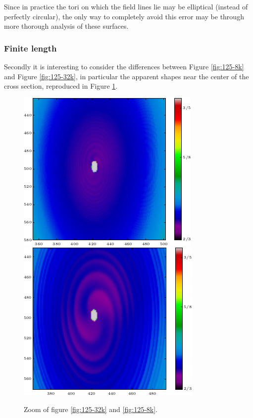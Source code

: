 \documentclass[a4paper]{article}
\begin{document}
Since in practice the tori on which the field lines lie may be elliptical (instead of perfectly circular), the only way to completely avoid this error may be through more thorough analysis of these surfaces.\\

\subsubsection{Finite length}
Secondly it is interesting to consider the differences between Figure \ref{fig:125-8k} and Figure \ref{fig:125-32k}, in particular the apparent shapes near the center of the cross section, reproduced in Figure \ref{fig:artefacts}.
\begin{figure}[!hb]
	\centering
{}
  \includegraphics[width=\linewidth]{Figures/artefact32k.png}
\endminipage ~
  \includegraphics[width=\linewidth]{Figures/artefact8k.png}
\endminipage\hfill
	\caption{Zoom of figure \ref{fig:125-32k} and \ref{fig:125-8k}.}\label{fig:artefacts}
\end{figure}
\end{document}
